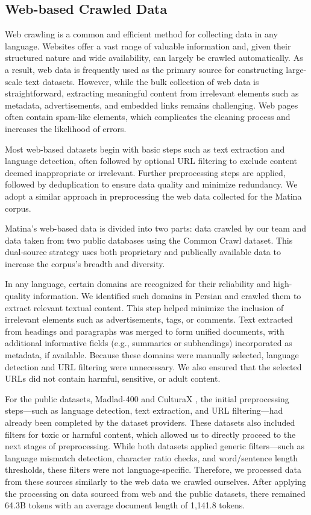 \subsection{Web-based Crawled Data}
Web crawling is a common and efficient method for collecting data in any language. Websites offer a vast range of valuable information and, given their structured nature and wide availability, can largely be crawled automatically. As a result, web data is frequently used as the primary source for constructing large-scale text datasets. However, while the bulk collection of web data is straightforward, extracting meaningful content from irrelevant elements such as metadata, advertisements, and embedded links remains challenging. Web pages often contain spam-like elements, which complicates the cleaning process and increases the likelihood of errors.

Most web-based datasets begin with basic steps such as text extraction and language detection, often followed by optional URL filtering to exclude content deemed inappropriate or irrelevant. Further preprocessing steps are applied, followed by deduplication to ensure data quality and minimize redundancy. We adopt a similar approach in preprocessing the web data collected for the Matina corpus.

Matina's web-based data is divided into two parts: data crawled by our team and data taken from two public databases using the Common Crawl \citep{commoncrawl} dataset. This dual-source strategy uses both proprietary and publically available data to increase the corpus's breadth and diversity.

In any language, certain domains are recognized for their reliability and high-quality information. We identified such domains in Persian and crawled them to extract relevant textual content. This step helped minimize the inclusion of irrelevant elements such as advertisements, tags, or comments. Text extracted from headings and paragraphs was merged to form unified documents, with additional informative fields (e.g., summaries or subheadings) incorporated as metadata, if available. Because these domains were manually selected, language detection and URL filtering were unnecessary. We also ensured that the selected URLs did not contain harmful, sensitive, or adult content.

For the public datasets, Madlad-400 \citep{kudugunta2024madlad} and CulturaX \citep{nguyen2023culturax}, the initial preprocessing steps—such as language detection, text extraction, and URL filtering—had already been completed by the dataset providers. These datasets also included filters for toxic or harmful content, which allowed us to directly proceed to the next stages of preprocessing. While both datasets applied generic filters—such as language mismatch detection, character ratio checks, and word/sentence length thresholds, these filters were not language-specific. Therefore, we processed data from these sources similarly to the web data we crawled ourselves. After applying the processing on data sourced from web and the public datasets, there remained 64.3B tokens with an average document length of 1,141.8 tokens. 

